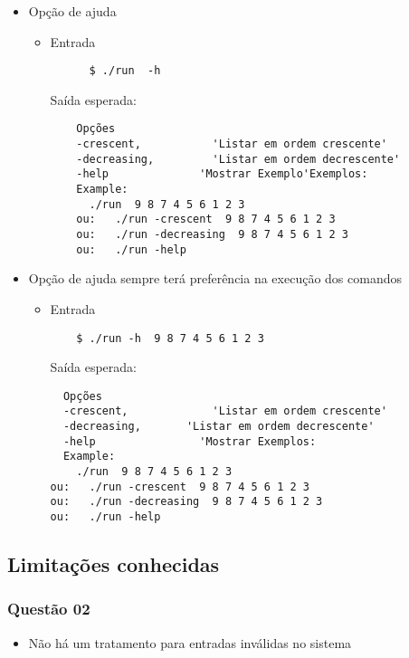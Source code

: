 \documentclass[11pt,a4paper]{article}
\begin{document}
\begin{itemize}
  \item Opção de ajuda
  \begin{itemize}
    \item Entrada
    \begin{verbatim}
      $ ./run  -h
    \end{verbatim}
    Saída esperada:
    \begin{verbatim}
    Opções
    -crescent, 			 'Listar em ordem crescente'
    -decreasing, 		 'Listar em ordem decrescente'
    -help 		       'Mostrar Exemplo'Exemplos:
    Example:
      ./run  9 8 7 4 5 6 1 2 3
	ou:   ./run -crescent  9 8 7 4 5 6 1 2 3
	ou:	  ./run -decreasing  9 8 7 4 5 6 1 2 3
	ou:	  ./run -help
\end{verbatim}
\end{itemize}


\item Opção de ajuda sempre terá preferência na execução dos comandos
\begin{itemize}
  \item Entrada
  \begin{verbatim}
    $ ./run -h  9 8 7 4 5 6 1 2 3
  \end{verbatim}
  Saída esperada:
  \begin{verbatim}
  Opções
  -crescent, 			 'Listar em ordem crescente'
  -decreasing, 		 'Listar em ordem decrescente'
  -help 		       'Mostrar Exemplos:
  Example:
    ./run  9 8 7 4 5 6 1 2 3
ou:   ./run -crescent  9 8 7 4 5 6 1 2 3
ou:	  ./run -decreasing  9 8 7 4 5 6 1 2 3
ou:	  ./run -help
\end{verbatim}
\end{itemize}
\end{itemize}


\subsection{Limitações conhecidas}

\subsubsection{Questão 02}
\begin{itemize}
  \item Não há um tratamento para entradas inválidas no sistema
\end{itemize}
\end{document}
